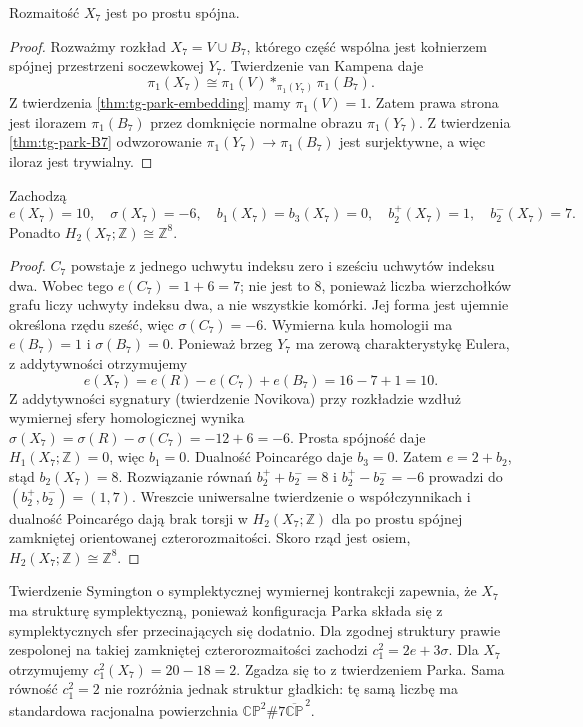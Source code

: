 \begin{twierdzenie}
\label{thm:tg-park-pi1}
Rozmaitość $X_7$ jest po prostu spójna.
\end{twierdzenie}

\begin{proof}
Rozważmy rozkład $X_7=V\cup B_7$,
którego część wspólna jest kołnierzem spójnej
przestrzeni soczewkowej $Y_7$.
Twierdzenie van Kampena daje
\[
\pi_1(X_7)\cong
\pi_1(V)*_{\pi_1(Y_7)}\pi_1(B_7).
\]
Z twierdzenia \ref{thm:tg-park-embedding} mamy
$\pi_1(V)=1$. Zatem prawa strona jest ilorazem
$\pi_1(B_7)$ przez domknięcie normalne obrazu
$\pi_1(Y_7)$. Z twierdzenia \ref{thm:tg-park-B7}
odwzorowanie $\pi_1(Y_7)\to\pi_1(B_7)$ jest
surjektywne, a więc iloraz jest trywialny.
\end{proof}

\begin{twierdzenie}
\label{thm:tg-park-numbers}
Zachodzą
\[
e(X_7)=10,\quad \sigma(X_7)=-6,\quad
b_1(X_7)=b_3(X_7)=0,\quad
b_2^+(X_7)=1,\quad b_2^-(X_7)=7.
\]
Ponadto $H_2(X_7;\mathbb Z)\cong\mathbb Z^8$.
\end{twierdzenie}

\begin{proof}
$C_7$ powstaje z jednego uchwytu indeksu zero
i sześciu uchwytów indeksu dwa. Wobec tego
$e(C_7)=1+6=7$; nie jest to $8$, ponieważ
liczba wierzchołków grafu liczy uchwyty indeksu
dwa, a nie wszystkie komórki. Jej forma jest
ujemnie określona rzędu sześć, więc
$\sigma(C_7)=-6$.
Wymierna kula homologii ma $e(B_7)=1$ i
$\sigma(B_7)=0$.
Ponieważ brzeg $Y_7$ ma zerową charakterystykę
Eulera, z addytywności otrzymujemy
\[
e(X_7)=e(R)-e(C_7)+e(B_7)=16-7+1=10.
\]
Z addytywności sygnatury (twierdzenie Novikova)
przy rozkładzie wzdłuż wymiernej sfery homologicznej
wynika $\sigma(X_7)=\sigma(R)-\sigma(C_7)=-12+6=-6$.
Prosta spójność daje $H_1(X_7;\mathbb Z)=0$, więc
$b_1=0$. Dualność Poincarégo daje $b_3=0$.
Zatem $e=2+b_2$, stąd $b_2(X_7)=8$.
Rozwiązanie równań $b_2^++b_2^-=8$ i
$b_2^+-b_2^-=-6$ prowadzi do $(b_2^+,b_2^-)=(1,7)$.
Wreszcie uniwersalne twierdzenie o współczynnikach
i dualność Poincarégo dają brak torsji w
$H_2(X_7;\mathbb Z)$ dla po prostu spójnej zamkniętej
orientowanej czterorozmaitości. Skoro rząd jest osiem,
$H_2(X_7;\mathbb Z)\cong\mathbb Z^8$.
\end{proof}

\begin{przyklad}
Twierdzenie Symington o symplektycznej wymiernej kontrakcji
zapewnia, że $X_7$ ma strukturę symplektyczną, ponieważ
konfiguracja Parka składa się z symplektycznych sfer
przecinających się dodatnio. Dla zgodnej struktury prawie
zespolonej na takiej zamkniętej czterorozmaitości zachodzi
$c_1^2=2e+3\sigma$. Dla $X_7$ otrzymujemy
$c_1^2(X_7)=20-18=2$.
Zgadza się to z twierdzeniem Parka. Sama równość
$c_1^2=2$ nie rozróżnia jednak struktur gładkich:
tę samą liczbę ma standardowa racjonalna powierzchnia
$\mathbb{CP}^{2}\#7\overline{\mathbb{CP}}^{\,2}$.
\end{przyklad}

